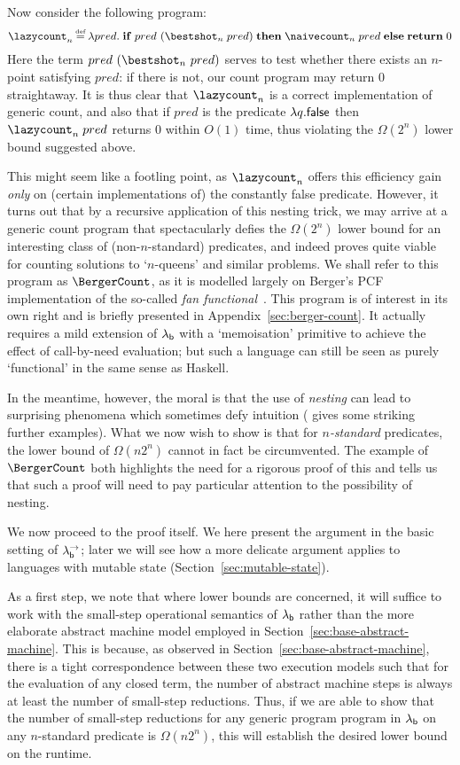 \documentclass[12pt,phd,lfcs,twoside,openright,logo,leftchapter,normalheadings]{infthesis}
\theoremstyle{plain}
\theoremstyle{definition}
\begin{document}
Now consider the following program:
%
{
\[
  \lazycount_n \defas \lambda pred.\; \If \; pred~(\bestshot_n\;pred)\; \Then\; \naivecount_n\;pred\; \Else\; \Return\;0
\]}%
%
Here the term $pred~(\bestshot_n~pred)$ serves to test whether there
exists an $n$-point satisfying $pred$: if there is not, our count
program may return $0$ straightaway.  It is thus clear that
$\lazycount_n$ is a correct implementation of generic count, and also
that if $pred$ is the predicate $\lambda q.\mathsf{false}$ then
$\lazycount_n\;pred$ returns $0$ within $O(1)$ time, thus violating
the $\Omega(2^n)$ lower bound suggested above.

This might seem like a footling point, as $\lazycount_n$ offers this
efficiency gain \emph{only} on (certain implementations of) the
constantly false predicate.  However, it turns out that by a recursive
application of this nesting trick, we may arrive at a generic count
program that spectacularly defies the $\Omega(2^n)$ lower bound for an
interesting class of (non-$n$-standard) predicates, and indeed proves
quite viable for counting solutions to `$n$-queens' and similar
problems.  We shall refer to this program as $\BergerCount$, as it is
modelled largely on Berger's PCF implementation of the so-called
\emph{fan functional}~\citep{Berger90, LongleyN15}. This program is of
interest in its own right and is briefly presented in
Appendix~\ref{sec:berger-count}. It actually requires a mild
extension of $\lambda_{\mathsf{b}}$ with a `memoisation' primitive to achieve the
effect of call-by-need evaluation; but such a language can still be
seen as purely `functional' in the same sense as Haskell.

In the meantime, however, the moral is that the use of \emph{nesting}
can lead to surprising phenomena which sometimes defy intuition
(\citet{Escardo07} gives some striking further examples). What we now
wish to show is that for \emph{$n$-standard} predicates, the \naive
lower bound of $\Omega(n2^n)$ cannot in fact be circumvented. The
example of $\BergerCount$ both highlights the need for a rigorous
proof of this and tells us that such a proof will need to pay
particular attention to the possibility of nesting.

We now proceed to the proof itself. We here present the argument in
the basic setting of $\lambda^\rightarrow_{\mathsf{b}}$; later we will see how a more delicate
argument applies to languages with mutable state
(Section~\ref{sec:mutable-state}).

As a first step, we note that where lower bounds are concerned, it
will suffice to work with the small-step operational semantics of
$\lambda_{\mathsf{b}}$ rather than the more elaborate abstract machine model
employed in Section~\ref{sec:base-abstract-machine}. This is because,
as observed in Section~\ref{sec:base-abstract-machine}, there is a
tight correspondence between these two execution models such that for
the evaluation of any closed term, the number of abstract machine
steps is always at least the number of small-step reductions.  Thus,
if we are able to show that the number of small-step reductions for
any generic program program in $\lambda_{\mathsf{b}}$ on any $n$-standard predicate
is $\Omega(n2^n)$, this will establish the desired lower bound on the
runtime.
\end{document}
